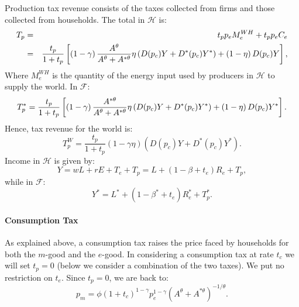 \documentclass[notitlepage,12pt]{article}
\begin{document}
Production tax revenue consists of the taxes collected from firms and those
collected from households. The total in $\mathcal{H}$ is:%
\begin{eqnarray*}
T_{p} &=&t_{p}p_{e}M_{e}^{WH}+t_{p}p_{e}C_{e} \\
&=&\frac{t_{p}}{1+t_{p}}\left[ \left( 1-\gamma \right) \frac{A^{\theta }}{%
A^{\theta }+A^{\ast \theta }}\eta \left( D(p_{c})Y+D^{\ast }(p_{c})Y^{\ast
}\right) +\left( 1-\eta \right) D(p_{c})Y\right] ,
\end{eqnarray*}%
Where $M_{e}^{WH}$ is the quantity of the energy input used by producers in $%
\mathcal{H}$ to supply the world. In $\mathcal{F}$:%
\begin{equation*}
T_{p}^{\ast }=\frac{t_{p}}{1+t_{p}}\left[ \left( 1-\gamma \right) \frac{%
A^{\ast \theta }}{A^{\theta }+A^{\ast \theta }}\eta \left( D(p_{c})Y+D^{\ast
}(p_{c})Y^{\ast }\right) +\left( 1-\eta \right) D(p_{c})Y^{\ast }\right] .
\end{equation*}%
Hence, tax revenue for the world is:%
\begin{equation*}
T_{p}^{W}=\frac{t_{p}}{1+t_{p}}\left( 1-\gamma \eta \right) \left(
D(p_{c})Y+D^{\ast }(p_{c})Y^{\ast }\right) .
\end{equation*}%
Income in $\mathcal{H}$ is given by:%
\begin{equation*}
Y=wL+rE+T_{e}+T_{p}=L+\left( 1-\beta +t_{e}\right) R_{e}+T_{p},
\end{equation*}%
while in $\mathcal{F}$:%
\begin{equation*}
Y^{\ast }=L^{\ast }+\left( 1-\beta ^{\ast }+t_{e}\right) R_{e}^{\ast
}+T_{p}^{\ast }.
\end{equation*}

\paragraph{Consumption Tax}

As explained above, a consumption tax raises the price faced by households
for both the $m$-good and the $e$-good. In considering a consumption tax at
rate $t_{c}$ we will set $t_{p}=0$ (below we consider a combination of the
two taxes). We put no restriction on $t_{e}$. Since $t_{p}=0$, we are back
to:%
\begin{equation*}
p_{m}=\phi (1+t_{c})^{1-\gamma }p_{e}^{1-\gamma }\left( A^{\theta }+A^{\ast
\theta }\right) ^{-1/\theta }.
\end{equation*}
\end{document}
